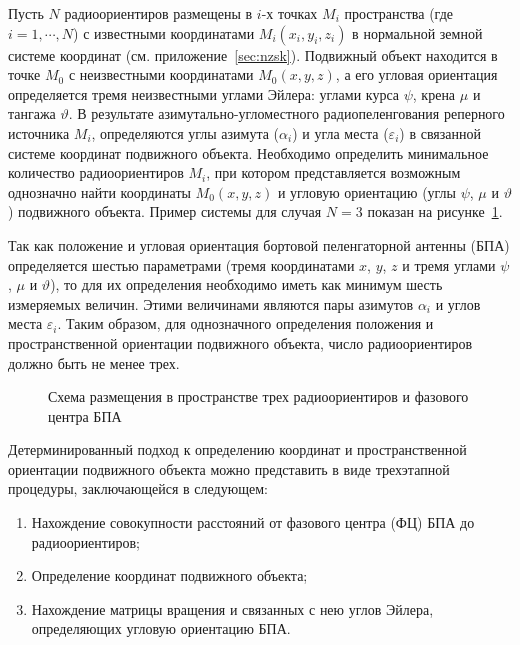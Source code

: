 \documentclass[../main.tex]{subfiles}
\begin{document}
\renewcommand{\figurename}{Рисунок}
Пусть $N$ радиоориентиров размещены в $i$-х точках $M_i$ пространства (где $i = 1, \cdots, N$) с известными
координатами $M_i\left(x_i, y_i, z_i\right)$ в нормальной земной системе координат (см. приложение~\ref{sec:nzsk}). Подвижный объект находится в точке $M_0$ с неизвестными координатами $M_0\left(x, y, z\right)$, а его угловая ориентация определяется тремя неизвестными углами Эйлера: углами курса $\psi$, крена $\mu$ и тангажа $\vartheta$. В результате азимутально-угломестного радиопеленгования реперного источника $M_i$, определяются углы азимута ($\alpha_i$) и угла места ($\varepsilon_i$) в связанной системе координат подвижного объекта. Необходимо определить минимальное количество радиоориентиров $M_i$, при котором представляется возможным однозначно найти координаты $M_0\left(x, y, z\right)$ и угловую ориентацию (углы $\psi$, $\mu$ и $\vartheta$) подвижного объекта. Пример системы для случая $N=3$ показан на рисунке~\ref{fig:tetrahedron:pic1}.

Так как положение и угловая ориентация бортовой пеленгаторной антенны (БПА) определяется шестью параметрами
(тремя координатами $x$, $y$, $z$ и тремя углами $\psi$, $\mu$ и $\vartheta$), то для их определения необходимо иметь как минимум шесть измеряемых величин. Этими величинами являются пары азимутов $\alpha_i$ и углов места $\varepsilon_i$. Таким образом, для однозначного определения положения и пространственной ориентации подвижного объекта, число радиоориентиров должно быть не менее трех.

\begin{figure}[htbp]
    \centering


    \caption{Схема размещения в пространстве трех радиоориентиров и фазового центра БПА}
    \label{fig:tetrahedron:pic1}
\end{figure}


Детерминированный подход к определению координат и пространственной ориентации подвижного объекта можно представить в виде трехэтапной процедуры, заключающейся в следующем:
\begin{enumerate}
    \item Нахождение совокупности расстояний от фазового центра (ФЦ) БПА до радиоориентиров;
    \item Определение координат подвижного объекта;
    \item Нахождение матрицы вращения и связанных с нею углов Эйлера, определяющих угловую ориентацию БПА.
\end{enumerate}
\end{document}
